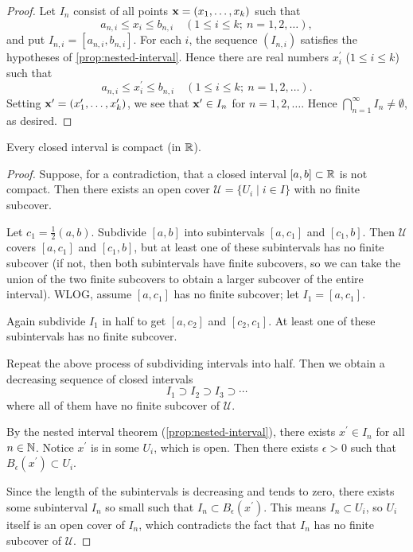 \begin{proof}
Let $I_n$ consist of all points $\vb{x}=(x_1,\dots,x_k)$ such that
\[a_{n,i}\le x_i\le b_{n,i}\quad(1\le i\le k;\:n=1,2,\dots),\]
and put $I_{n,i}=[a_{n,i},b_{n,i}]$. For each $i$, the sequence $(I_{n,i})$ satisfies the hypotheses of \ref{prop:nested-interval}. Hence there are real numbers $x_i^\prime$ ($1\le i\le k$) such that
\[a_{n,i}\le x_i^\prime\le b_{n,i}\quad(1\le i\le k;\:n=1,2,\dots).\]
Setting $\vb{x}^\prime=(x_1^\prime,\dots,x_k^\prime)$, we see that $\vb{x}^\prime\in I_n$ for $n=1,2,\dots$. Hence $\bigcap_{n=1}^{\infty}I_n\neq\emptyset$, as desired.
\end{proof}

\begin{lemma}
Every closed interval is compact (in $\mathbb R$).
\end{lemma}

\begin{figure}[H]
\centering
{}
\end{figure}

\begin{proof}
Suppose, for a contradiction, that a closed interval $[a,b]\subset\mathbb R$ is not compact. Then there exists an open cover $\mathcal{U}=\{U_i\mid i\in I\}$ with no finite subcover.

Let $c_1=\frac{1}{2}(a,b)$. Subdivide $[a,b]$ into subintervals $[a,c_1]$ and $[c_1,b]$. Then $\mathcal{U}$ covers $[a,c_1]$ and $[c_1,b]$, but at least one of these subintervals has no finite subcover (if not, then both subintervals have finite subcovers, so we can take the union of the two finite subcovers to obtain a larger subcover of the entire interval). WLOG, assume $[a,c_1]$ has no finite subcover; let $I_1=[a,c_1]$.

Again subdivide $I_1$ in half to get $[a,c_2]$ and $[c_2,c_1]$. At least one of these subintervals has no finite subcover.

Repeat the above process of subdividing intervals into half. Then we obtain a decreasing sequence of closed intervals
\[I_1\supset I_2\supset I_3\supset\cdots\]
where all of them have no finite subcover of $\mathcal{U}$.

By the nested interval theorem (\ref{prop:nested-interval}), there exists $x^\prime\in I_n$ for all $n\in\mathbb N$. Notice $x^\prime$ is in some $U_i$, which is open. Then there exists $\epsilon>0$ such that $B_\epsilon(x^\prime)\subset U_i$.

Since the length of the subintervals is decreasing and tends to zero, there exists some subinterval $I_n$ so small such that $I_n\subset B_\epsilon(x^\prime)$. This means $I_n\subset U_i$, so $U_i$ itself is an open cover of $I_n$, which contradicts the fact that $I_n$ has no finite subcover of $\mathcal{U}$.
\end{proof}

